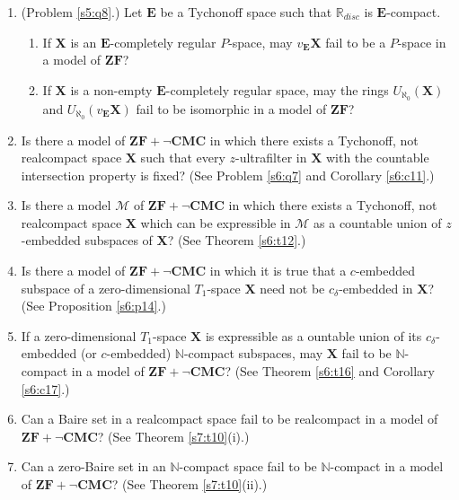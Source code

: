 \documentclass[12pt,twoside,leqno]{article}
\theoremstyle{plain}
\theoremstyle{definition}
\theoremstyle{remark}
\begin{document}
\begin{enumerate}
	\item (Problem \ref{s5:q8}.) Let $\mathbf{E}$ be a Tychonoff space such that $\mathbb{R}_{disc}$ is $\mathbf{E}$-compact. 
	\begin{enumerate}
		\item[(i)]  If $\mathbf{X}$ is an $\mathbf{E}$-completely regular $P$-space, may $v_{\mathbf{E}}\mathbf{X}$ fail to be a $P$-space in a model of $\mathbf{ZF}$?
		\item[(ii)] If $\mathbf{X}$ is a non-empty $\mathbf{E}$-completely regular space, may the rings $U_{\aleph_0}(\mathbf{X})$ and $U_{\aleph_0}(v_{\mathbf{E}}\mathbf{X})$ fail to be isomorphic in a model of $\mathbf{ZF}$?
	\end{enumerate}
	
	\item Is there a model of $\mathbf{ZF+\neg CMC}$ in which there exists a Tychonoff, not realcompact space $\mathbf{X}$ such that every $z$-ultrafilter in $\mathbf{X}$ with the countable intersection property is fixed? (See Problem \ref{s6:q7} and Corollary \ref{s6:c11}.)
	
	\item Is there a model $\mathcal{M}$ of $\mathbf{ZF+\neg CMC}$ in which there exists a Tychonoff, not realcompact space $\mathbf{X}$ which can be expressible in $\mathcal{M}$ as a countable union of $z$-embedded subspaces of $\mathbf{X}$? (See Theorem \ref{s6:t12}.)
	
	\item Is there a model of $\mathbf{ZF+\neg CMC}$ in which it is true that a $c$-embedded subspace of a zero-dimensional $T_1$-space $\mathbf{X}$ need not be $c_{\delta}$-embedded in $\mathbf{X}$? (See Proposition \ref{s6:p14}.)
	
	\item  If a zero-dimensional $T_1$-space $\mathbf{X}$ is expressible as a ountable union of its $c_{\delta}$-embedded (or $c$-embedded) $\mathbb{N}$-compact subspaces, may $\mathbf{X}$ fail to be $\mathbb{N}$-compact in a model of $\mathbf{ZF+\neg CMC}$? (See Theorem \ref{s6:t16} and Corollary \ref{s6:c17}.)
	
	\item Can a Baire set in a realcompact space fail to be realcompact in a model of $\mathbf{ZF+\neg CMC}$? (See Theorem \ref{s7:t10}(i).)
	
	\item Can a zero-Baire set in an $\mathbb{N}$-compact space fail to be $\mathbb{N}$-compact in a model of $\mathbf{ZF+\neg CMC}$? (See Theorem \ref{s7:t10}(ii).)
	

\end{enumerate}
\end{document}
